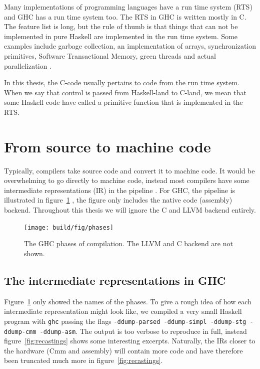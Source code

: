 Many implementations of programming languages have a run time system
(RTS) and GHC has a run time system too. The RTS in GHC is written
mostly in C. The feature list is long, but the rule of thumb is that
things that can not be implemented in pure Haskell are implemented
in the run time system. Some examples include garbage collection,
an implementation of arrays, synchronization primitives, Software
Transactional Memory, green threads and actual parallelization
\cite{commentary_rts}.

In this thesis, the C-code usually pertains to code from the run time
system. When we say that control is passed from Haskell-land to C-land,
we mean that some Haskell code have called a primitive function that is
implemented in the RTS.

\section{From source to machine code}

Typically, compilers take source code and convert it to machine code.
It would be overwhelming to go directly to machine code, instead most
compilers have some intermediate representations (IR) in the pipeline \cite[p.358]{aho2007compilers}.  For GHC, the pipeline is illustrated in
figure~\ref{fig:ghc_phases} \cite{terei2009low}, the figure only
includes the native code (assembly) backend. Throughout this thesis we will ignore the
C and LLVM backend entirely.

\begin{figure}
\begin{mdframed}
  \centering
  \texttt{[image: build/fig/phases]}
  \caption{The GHC phases of compilation. The LLVM and C backend are not
    shown.}\label{fig:ghc_phases}
\end{mdframed}
\end{figure}

\subsection{The intermediate representations in GHC}

Figure~\ref{fig:ghc_phases} only showed the names of the phases. To
give a rough idea of how each intermediate representation might look
like, we compiled a very small Haskell program with \texttt{ghc} passing
the flags \texttt{-ddump-parsed -ddump-simpl -ddump-stg
-ddump-cmm -ddump-asm}. The output is too verbose to reproduce in
full, instead figure~\ref{fig:recastings} shows some interesting excerpts. Naturally, the
IRs closer to the hardware (Cmm and assembly) will contain more
code and have therefore been truncated much more in figure~\ref{fig:recastings}.

